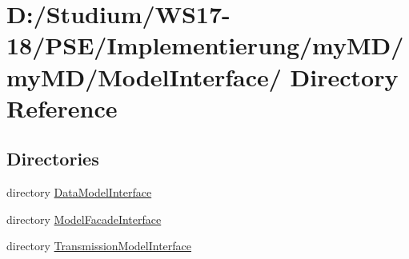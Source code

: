 \hypertarget{dir_D_3A_2FStudium_2FWS17_2D18_2FPSE_2FImplementierung_2FmyMD_2FmyMD_2FModelInterface_2F}{
\section{D:/Studium/WS17-18/PSE/Implementierung/my\-MD/my\-MD/Model\-Interface/ Directory Reference}
\label{dir_D_3A_2FStudium_2FWS17_2D18_2FPSE_2FImplementierung_2FmyMD_2FmyMD_2FModelInterface_2F}
}


\subsection*{Directories}
\begin{CompactItemize}
\item 
directory \hyperlink{dir_D_3A_2FStudium_2FWS17_2D18_2FPSE_2FImplementierung_2FmyMD_2FmyMD_2FModelInterface_2FDataModelInterface_2F}{Data\-Model\-Interface}
\item 
directory \hyperlink{dir_D_3A_2FStudium_2FWS17_2D18_2FPSE_2FImplementierung_2FmyMD_2FmyMD_2FModelInterface_2FModelFacadeInterface_2F}{Model\-Facade\-Interface}
\item 
directory \hyperlink{dir_D_3A_2FStudium_2FWS17_2D18_2FPSE_2FImplementierung_2FmyMD_2FmyMD_2FModelInterface_2FTransmissionModelInterface_2F}{Transmission\-Model\-Interface}
\end{CompactItemize}
